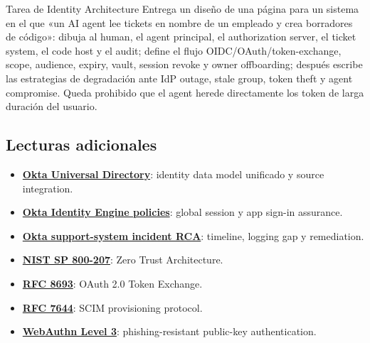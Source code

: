 \begin{importantbox}{Tarea de Identity Architecture}
Entrega un diseño de una página para un sistema en el que «un AI agent lee tickets en nombre de un empleado y crea borradores de código»: dibuja al human, el agent principal, el authorization server, el ticket system, el code host y el audit; define el flujo OIDC/OAuth/token-exchange, scope, audience, expiry, vault, session revoke y owner offboarding; después escribe las estrategias de degradación ante IdP outage, stale group, token theft y agent compromise. Queda prohibido que el agent herede directamente los token de larga duración del usuario.
\end{importantbox}

\subsection{Lecturas adicionales}

{\small
\begin{itemize}[nosep,leftmargin=*]
  \item \href{https://developer.okta.com/docs/concepts/universal-directory/}{\textbf{Okta Universal Directory}}: identity data model unificado y source integration.
  \item \href{https://help.okta.com/oie/en-us/content/topics/identity-engine/policies/about-policies.htm}{\textbf{Okta Identity Engine policies}}: global session y app sign-in assurance.
  \item \href{https://sec.okta.com/articles/2023/11/unauthorized-access-oktas-support-case-management-system-root-cause/}{\textbf{Okta support-system incident RCA}}: timeline, logging gap y remediation.
  \item \href{https://csrc.nist.gov/pubs/sp/800/207/final}{\textbf{NIST SP 800-207}}: Zero Trust Architecture.
  \item \href{https://www.rfc-editor.org/rfc/rfc8693}{\textbf{RFC 8693}}: OAuth 2.0 Token Exchange.
  \item \href{https://www.rfc-editor.org/rfc/rfc7644}{\textbf{RFC 7644}}: SCIM provisioning protocol.
  \item \href{https://www.w3.org/TR/webauthn-3/}{\textbf{WebAuthn Level 3}}: phishing-resistant public-key authentication.
\end{itemize}
}


